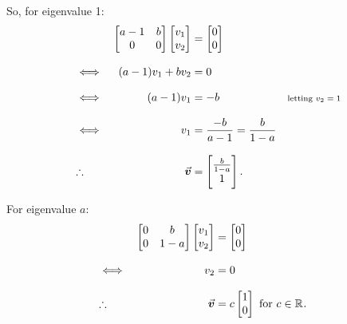 \documentclass[../MathsNotesBase.tex]{subfiles}
\begin{document}
{		So, for eigenvalue 1:
		\begin{align*}
		&& \begin{bmatrix}
		a-1 & b\\
		0 & 0
		\end{bmatrix} \begin{bmatrix}v_1\\v_2\end{bmatrix} &= \begin{bmatrix}0\\0\end{bmatrix} \\[8pt]
		&\iff & (a - 1)v_1 + b v_2 &= 0 &\text{\scriptsize{}} \\[8pt]
		&\iff & (a - 1)v_1 &= -b &\text{\scriptsize{letting ${ v_2 = 1 }$}} \\[8pt]
		&\iff & v_1 &= \frac{-b}{a - 1} = \frac{b}{1 - a}\\[8pt]
		&\therefore & \vec{\bm{v}} &= \begin{bmatrix}\frac{b}{1 - a}\\1\end{bmatrix}.
		\end{align*}
		
		For eigenvalue $a$:
		\begin{align*}
		&& \begin{bmatrix}
		0 & b\\
		0 & 1-a
		\end{bmatrix} \begin{bmatrix}v_1\\v_2\end{bmatrix} &= \begin{bmatrix}0\\0\end{bmatrix}  \\[8pt]
		&\iff & v_2 &= 0 &\text{\scriptsize{}}\\[8pt]
		&\therefore & \vec{\bm{v}} &= c\begin{bmatrix}1\\0\end{bmatrix} \text{ for } c \in \mathbb{R}^{}.
		\end{align*}
		
}
\end{document}
